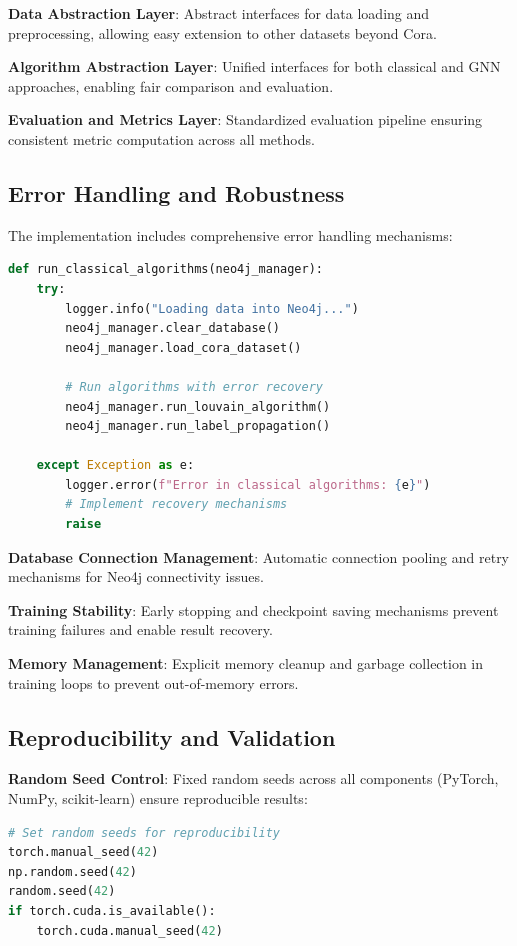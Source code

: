 \documentclass[conference]{IEEEtran}
\begin{document}
\textbf{Data Abstraction Layer}: Abstract interfaces for data loading and preprocessing, allowing easy extension to other datasets beyond Cora.

\textbf{Algorithm Abstraction Layer}: Unified interfaces for both classical and GNN approaches, enabling fair comparison and evaluation.

\textbf{Evaluation and Metrics Layer}: Standardized evaluation pipeline ensuring consistent metric computation across all methods.

\subsection{Error Handling and Robustness}

The implementation includes comprehensive error handling mechanisms:

\begin{lstlisting}[language=Python, caption=Error Handling and Recovery Mechanisms]
def run_classical_algorithms(neo4j_manager):
    try:
        logger.info("Loading data into Neo4j...")
        neo4j_manager.clear_database()
        neo4j_manager.load_cora_dataset()
        
        # Run algorithms with error recovery
        neo4j_manager.run_louvain_algorithm()
        neo4j_manager.run_label_propagation()
        
    except Exception as e:
        logger.error(f"Error in classical algorithms: {e}")
        # Implement recovery mechanisms
        raise
\end{lstlisting}

\textbf{Database Connection Management}: Automatic connection pooling and retry mechanisms for Neo4j connectivity issues.

\textbf{Training Stability}: Early stopping and checkpoint saving mechanisms prevent training failures and enable result recovery.

\textbf{Memory Management}: Explicit memory cleanup and garbage collection in training loops to prevent out-of-memory errors.

\subsection{Reproducibility and Validation}

\textbf{Random Seed Control}: Fixed random seeds across all components (PyTorch, NumPy, scikit-learn) ensure reproducible results:

\begin{lstlisting}[language=Python, caption=Reproducibility Configuration]
# Set random seeds for reproducibility
torch.manual_seed(42)
np.random.seed(42)
random.seed(42)
if torch.cuda.is_available():
    torch.cuda.manual_seed(42)
\end{lstlisting}
\end{document}
